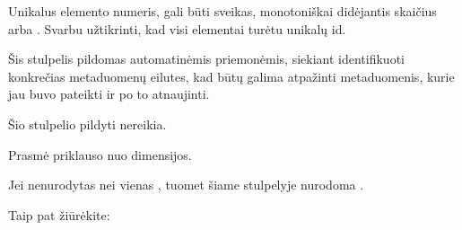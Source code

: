 \documentclass[letterpaper,10pt,lithuanian]{sphinxmanual}
\begin{document}
\begin{fulllineitems}
\label{\detokenize{formatas:id}}
\pysigstartsignatures
{}
\pysigstopsignatures
\sphinxAtStartPar
{}

\sphinxAtStartPar
Unikalus elemento numeris, gali būti sveikas, monotoniškai didėjantis
skaičius arba . Svarbu užtikrinti, kad visi elementai
turėtu unikalų id.

\sphinxAtStartPar
Šis stulpelis pildomas automatinėmis priemonėmis, siekiant identifikuoti
konkrečias metaduomenų eilutes, kad būtų galima atpažinti metaduomenis,
kurie jau buvo pateikti ir po to atnaujinti.

\sphinxAtStartPar
Šio stulpelio pildyti nereikia.

\end{fulllineitems}


\begin{fulllineitems}
\label{\detokenize{formatas:type}}
\pysigstartsignatures
{}
\pysigstopsignatures
\sphinxAtStartPar
{}

\sphinxAtStartPar
Prasmė priklauso nuo dimensijos.

\sphinxAtStartPar
Jei nenurodytas nei vienas {\hyperref[\detokenize{formatas:dimensijos-stulpeliai}]{}}, tuomet šiame stulpelyje nurodoma {\hyperref[\detokenize{dimensijos:papildomos-dimensijos}]{}}.


\begin{sphinxseealso}{Taip pat žiūrėkite:}

\sphinxAtStartPar
{\hyperref[\detokenize{tipai:duomenu-tipai}]{}}


\end{sphinxseealso}


\end{fulllineitems}

\end{document}
